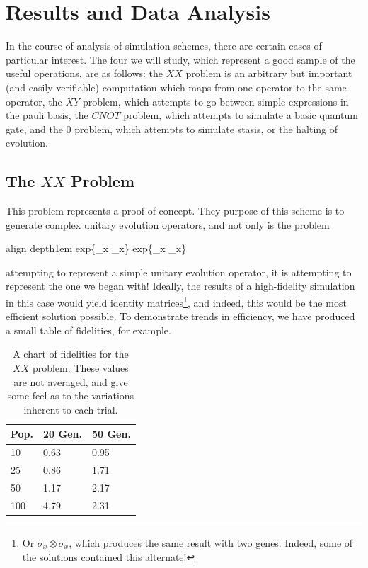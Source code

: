 \documentclass[11pt,twocolumn]{article}
\newcommand*\mystrut[1]{\vrule width0pt height0pt depth#1\relax}
\begin{document}

			\section{Results and Data Analysis} \label{results}

	In the course of analysis of simulation schemes, there are certain cases of particular interest. The four we will study, which represent a good sample of the useful operations, are as follows: the $XX$ problem is an arbitrary but important (and easily verifiable) computation which maps from one operator to the same operator, the $XY$ problem, which attempts to go between simple expressions in the pauli basis, the $CNOT$ problem, which attempts to simulate a basic quantum gate, and the 0 problem, which attempts to simulate stasis, or the halting of evolution. 


		\subsection{The $XX$ Problem} \label{xx}

	This problem represents a proof-of-concept. They purpose of this scheme is to generate complex unitary evolution operators, and not only is the problem

	\begin{empheq}[box=\fbox]{align}
		\mystrut{1em} exp\{\sigma_x \otimes \sigma_x\} \mapsto exp\{\sigma_x \otimes \sigma_x\}
	\end{empheq}

	attempting to represent a simple unitary evolution operator, it is attempting to represent the one we began with! Ideally, the results of a high-fidelity simulation in this case would yield identity matrices\footnote{Or $\sigma_x\otimes\sigma_x$, which produces the same result with two genes. Indeed, some of the solutions contained this alternate!}, and indeed, this would be the most efficient solution possible. To demonstrate trends in efficiency, we have produced a small table of fidelities, for example. 

	\begin{table}[htpb]
		\centering
			\begin{tabular}{||l | l l ||} 
			\hline
				Pop. & 20 Gen. & 50 Gen. \\ [0.5ex] 
			\hline
				10  & 0.63   & 0.95      \\ 
				25  & 0.86   & 1.71      \\
				50  & 1.17   & 2.17      \\
				100 & 4.79   & 2.31      \\
			\hline
			\end{tabular}
		\centering
		\caption{A chart of fidelities for the $XX$ problem. These values are not averaged, and give some feel as to the variations inherent to each trial.}
	\end{table}
\end{document}
